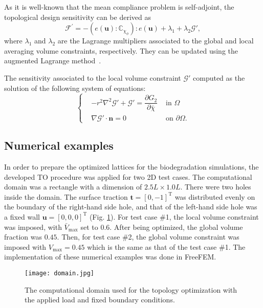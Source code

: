 As it is well-known that the mean compliance problem is self-adjoint, the topological design sensitivity can be derived as
\begin{equation}
	\mathcal{F}^{\prime}=-\left(e(\boldsymbol{u}): \mathbb{C}_{\chi_{\phi}}\right): e(\boldsymbol{u})+\lambda_{1} + \lambda_2 \mathcal{G}',
	\label{Eq: design sensitivity}
\end{equation}
where $\lambda_{1}$ and $\lambda_{2}$ are the Lagrange multipliers associated to the global and local averaging volume constraints, respectively. They can be updated using the augmented Lagrange method\ \cite{li2021full}.

The sensitivity associated to the local volume constraint $\mathcal{G}'$ computed as the solution of the following system of equations:
\begin{equation}
	\left\{\begin{aligned}	
		& -r^2 \nabla^2 \mathcal{G}' +  \mathcal{G}' =  \dfrac{\partial G_2}{\partial \bar{\chi}} & \text{ in } \Omega \\
		& \nabla\mathcal{G}' \cdot \boldsymbol{n} = 0 & \text{ on } \partial \Omega.
	\end{aligned}\right.
	\label{Eq: G'}
\end{equation}

\subsection{Numerical examples}\label{Section: numerical examples}
In order to prepare the optimized lattices for the biodegradation simulations, the developed TO procedure was applied for two 2D test cases. The computational domain was a rectangle with a dimension of $2.5L \times 1.0L$. There were two holes inside the domain. The surface traction $\boldsymbol{t}=\left[0,-1\right]^{\operatorname{T}}$ was distributed evenly on the boundary of the right-hand side hole, and that of the left-hand side hole was a fixed wall $\boldsymbol{u}=\left[0,0,0\right]^{\operatorname{T}}$ (Fig. \ref{fig:infill_domain}). For test case \#1, the local volume constraint was imposed, with $\bar{V}_{\max}$ set to $0.6$. After being optimized, the global volume fraction was $0.45$. Then, for test case \#2, the global volume constraint was imposed with $V_{\max}=0.45$ which is the same as that of the test case \#1. The implementation of these numerical examples was done in FreeFEM.


\begin{figure}[h]
\centering
\medskip
\texttt{[image: domain.jpg]}
\caption[Computational domain for the topology optimization]{The computational domain used for the topology optimization with the applied load and fixed boundary conditions.} \label{fig:infill_domain}
\end{figure}

